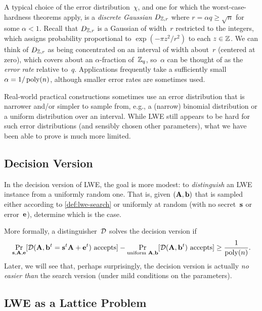 \documentclass[11pt]{article}
\begin{document}
A typical choice of the error distribution~$\chi$, and one for which
the worst-case-hardness theorems apply, is a \emph{discrete Gaussian}
$D_{\mathbb{Z}, r}$ where $r = \alpha q \geq \sqrt{n}$ for some $\alpha < 1$.
Recall that $D_{\mathbb{Z},r}$ is a Gaussian of width~$r$ restricted to the
integers, which assigns probability proportional to
$\exp(-\pi z^{2}/r^{2})$ to each $z \in \mathbb{Z}$. We can think of
$D_{\mathbb{Z},r}$ as being concentrated on an interval of width about~$r$
(centered at zero), which covers about an $\alpha$-fraction of~$\mathbb{Z}_q$,
so~$\alpha$ can be thought of as the \emph{error rate} relative
to~$q$. Applications frequently take a sufficiently small
$\alpha = 1/\operatorname{poly}(n)$, although smaller error rates are sometimes
used.

Real-world practical constructions sometimes use an error distribution
that is narrower and/or simpler to sample from, e.g., a (narrow)
binomial distribution or a uniform distribution over an interval.
While LWE still appears to be hard for such error distributions (and
sensibly chosen other parameters), what we have been able to prove is
much more limited.

\subsection{Decision Version}
\label{sec:decision}

In the decision version of LWE, the goal is more modest: to
\emph{distinguish} an LWE instance from a uniformly random one. That
is, given $(\mathbf{A}, \mathbf{b})$ that is sampled either according to
\cref{def:lwe-search} or uniformly at random (with no secret~$\mathbf{s}$
or error~$\mathbf{e}$), determine which is the case.

More formally, a distinguisher~$\mathcal{D}$ solves the decision version if
\begin{align*}
  \Pr_{\mathbf{s},\mathbf{A},\mathbf{e}}[\mathcal{D}(\mathbf{A}, \mathbf{b}^t = \mathbf{s}^t\mathbf{A}+\mathbf{e}^t) \text{ accepts}] - 
  \Pr_{\text{uniform } \mathbf{A},\mathbf{b}}[\mathcal{D}(\mathbf{A}, \mathbf{b}^t) \text{ accepts}] \geq
  \frac{1}{\operatorname{poly}(n)} .
\end{align*}
Later, we will see that, perhaps surprisingly, the decision version is
actually \emph{no easier than} the search version (under mild
conditions on the parameters).

\iffalse

\subsection{LWE as a Lattice Problem}
\label{sec:lwe-as-lattice}
\end{document}
